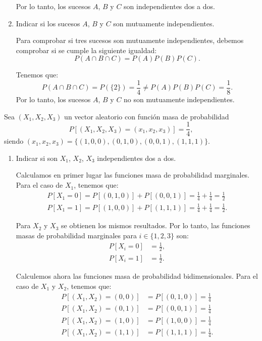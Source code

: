 \begin{ejercicio}
\begin{enumerate}
        Por lo tanto, los sucesos $A$, $B$ y $C$ son independientes dos a dos.
        \item Indicar si los sucesos $A$, $B$ y $C$ son mutuamente independientes.
        
        Para comprobar si tres sucesos son mutuamente independientes, debemos comprobar si se cumple la siguiente igualdad:
        \[
            P(A \cap B \cap C) = P(A)P(B)P(C).
        \]

        Tenemos que:
        \[
            P(A \cap B \cap C) = P(\{2\}) = \frac{1}{4} \neq P(A)P(B)P(C) = \frac{1}{8}.
        \]
        Por lo tanto, los sucesos $A$, $B$ y $C$ no son mutuamente independientes.
    \end{enumerate}
\end{ejercicio}

\begin{ejercicio}
    Sea $(X_1, X_2, X_3)$ un vector aleatorio con función masa de probabilidad
    \[
        P[(X_1, X_2, X_3) = (x_1, x_2, x_3)] = \frac{1}{4},
    \]
    siendo $(x_1, x_2, x_3) = \{(1,0,0),(0,1,0),(0,0,1),(1,1,1)\}$.
    \begin{enumerate}
        \item Indicar si son $X_1$, $X_2$, $X_3$ independientes dos a dos.
        
        Calculamos en primer lugar las funciones masa de probabilidad marginales. Para el caso de $X_1$, tenemos que:
        \begin{align*}
            P[X_1=0]=P[(0,1,0)]+P[(0,0,1)] = \frac{1}{4} + \frac{1}{4} = \frac{1}{2} \\
            P[X_1=1]=P[(1,0,0)]+P[(1,1,1)] = \frac{1}{4} + \frac{1}{4} = \frac{1}{2}.
        \end{align*}

        Para $X_2$ y $X_3$ se obtienen los mismos resultados. Por lo tanto, las funciones masas de probabilidad marginales para $i\in \{1,2,3\}$ son:
        \begin{align*}
            P[X_i=0] &= \frac{1}{2},\\
            P[X_i=1] &= \frac{1}{2}.
        \end{align*}

        Calculemos ahora las funciones masa de probabilidad bidimensionales. Para el caso de $X_1$ y $X_2$, tenemos que:
        \begin{align*}
            P[(X_1, X_2) = (0,0)] &= P[(0,1,0)] = \frac{1}{4} \\
            P[(X_1, X_2) = (0,1)] &= P[(0,0,1)] = \frac{1}{4} \\
            P[(X_1, X_2) = (1,0)] &= P[(1,0,0)] = \frac{1}{4} \\
            P[(X_1, X_2) = (1,1)] &= P[(1,1,1)] = \frac{1}{4}.
        \end{align*}


\end{enumerate}
\end{ejercicio}
